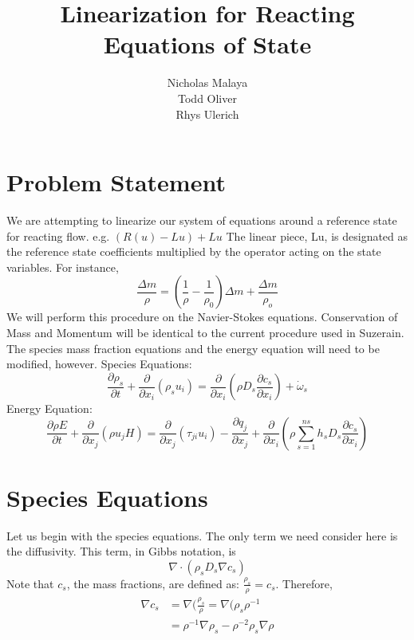 \documentclass[10pt]{article}
\title{Linearization for Reacting Equations of State}
\author{Nicholas Malaya \\
        Todd Oliver \\ 
	Rhys Ulerich \\ }
\begin{document}
\maketitle

\section{Problem Statement}

We are attempting to linearize our system of equations around a
reference state for reacting flow. e.g. $(R(u)-Lu) + Lu$
The linear piece, Lu, is designated as the reference state coefficients
multiplied by the operator acting on the state variables. For instance,
\begin{equation}
 \frac{\Delta m}{\rho} = (\frac{1}{\rho}-\frac{1}{\rho_0})\Delta m +
  \frac{\Delta m}{\rho_o}
\end{equation}
We will perform this procedure on the Navier-Stokes
equations. Conservation of Mass and Momentum will be identical to the
current procedure used in Suzerain. The species mass
fraction equations and the energy equation will need to be modified, however. 
\newline
\newline
Species Equations:
\begin{equation}
 \frac{\partial \rho_s}{\partial t} + \frac{\partial}{\partial
  x_i}(\rho_s u_i) = \frac{\partial}{\partial x_i}(\rho D_s
  \frac{\partial c_s}{\partial x_i}) + \dot \omega_s
\end{equation}
\newline
\newline
Energy Equation:
\begin{equation}
\frac{\partial \rho E}{\partial t} + \frac{\partial }{\partial x_j}(\rho
u_j H) = \frac{\partial }{\partial x_j}(\tau_{ji}u_i) - \frac{\partial
q_j}{\partial x_j} + \frac{\partial }{\partial x_i}(\rho \sum^{ns}_{s=1}
h_s D_s \frac{\partial c_s}{\partial x_i})
\end{equation}

\section{Species Equations}
Let us begin with the species equations. The only term we need consider here is the diffusivity. 
This term, in Gibbs notation, is 
\begin{equation}
  \nabla \cdot (\rho_s D_s \nabla c_s)
\end{equation}
Note that $c_s$, the mass fractions, are defined as: $\frac{\rho_s}{\rho} = c_s$. 
Therefore, 
\begin{eqnarray}
  \nabla c_s &= \nabla (\frac{\rho_s}{\rho} = \nabla (\rho_s \rho^{-1}\\
             &= \rho^{-1} \nabla \rho_s - \rho^{-2} \rho_s \nabla \rho
\end{eqnarray}
\end{document}
